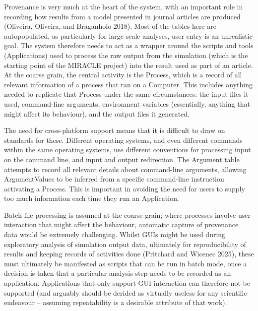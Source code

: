 Provenance is very much at the heart of the system, with an important
role in recording how results from a model presented in journal articles
are produced (Oliveira, Oliveira, and Braganholo 2018). Most of the
tables here are autopopulated, as particularly for large scale analyses,
user entry is an unrealistic goal. The system therefore needs to act as
a wrapper around the scripts and tools (Applications) used to process
the raw output from the simulation (which is the starting point of the
MIRACLE project) into the result used as part of an article. At the
coarse grain, the central activity is the Process, which is a record of
all relevant information of a process that ran on a Computer. This
includes anything needed to replicate that Process under the same
circumstances: the input files it used, command-line arguments,
environment variables (essentially, anything that might affect its
behaviour), and the output files it generated.

The need for cross-platform support means that it is difficult to draw
on standards for these. Different operating systems, and even different
commands within the same operating systems, use different conventions
for processing input on the command line, and input and output
redirection. The Argument table attempts to record all relevant details
about command-line arguments, allowing ArgumentValues to be inferred
from a specific command-line instruction activating a Process. This is
important in avoiding the need for users to supply too much information
each time they run an Application.

Batch-file processing is assumed at the coarse grain; where processes
involve user interaction that might affect the behaviour, automatic
capture of provenance data would be extremely challenging. Whilst GUIs
might be used during exploratory analysis of simulation output data,
ultimately for reproducibility of results and keeping records of
activities done (Pritchard and Wicenec 2025), these must ultimately be
manifested as scripts that can be run in batch mode, once a decision is
taken that a particular analysis step needs to be recorded as an
application. Applications that only support GUI interaction can
therefore not be supported (and arguably should be derided as virtually
useless for any scientific endeavour -- assuming repeatability is a
desirable attribute of that work).


